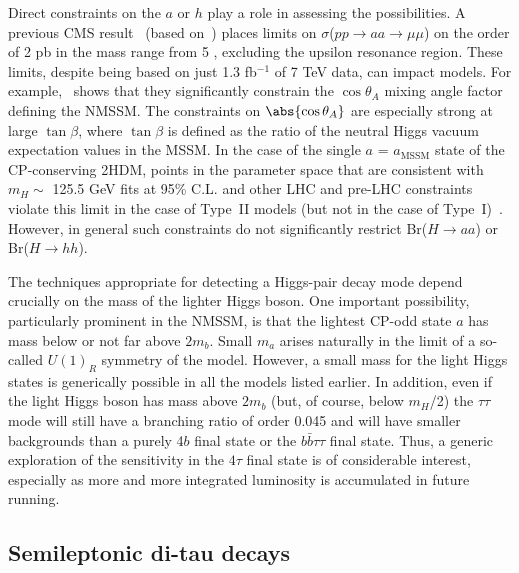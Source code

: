 Direct constraints on the $a$ or $h$ play a role in assessing the possibilities. A previous CMS result~\cite{Chatrchyan:2012am} (based on~\cite{Dermisek:2009fd}) places limits on $\sigma$($pp$$\rightarrow$$aa$$\rightarrow$$\mu\mu$) on the order of 2 pb in the mass range from 5 \GeV, excluding the upsilon resonance region.  These limits, despite being based on just 1.3 fb$^{-1}$ of 7 TeV data, can impact models. For example,~\cite{Chatrchyan:2012am} shows that they significantly constrain the $\cos\theta_A$ mixing angle factor defining the NMSSM.  The constraints on $\abs{\cos\theta_A}$ are especially strong at large $\tan\beta$, where $\tan\beta$ is defined as the ratio of the neutral Higgs vacuum expectation values in the MSSM. In the case of the single $a$ = $a_{\text{MSSM}}$ state of the CP-conserving 2HDM, points in the parameter space that are consistent with $m_H \sim$ 125.5 GeV fits at 95\% C.L. and other LHC and pre-LHC constraints violate this limit in the case of Type~II models (but not in the case of Type~I)~\cite{Dumont:2014wha}.  However, in general such constraints do not significantly restrict Br($H$$\rightarrow$$aa$) or Br($H$$\rightarrow$$hh$).  

The techniques appropriate for detecting a Higgs-pair decay mode depend crucially on the mass of the lighter Higgs boson. One important possibility, particularly prominent in the NMSSM, is that the lightest CP-odd state $a$ has mass below or not far above $2m_b$. Small $m_a$ arises naturally in the limit of a so-called $U(1)_R$ symmetry of the model. However, a small mass for the light Higgs states is generically possible in all the models listed earlier. In addition, even if the light Higgs boson has mass above $2m_b$ (but, of course, below $m_H$/2) the $\tau\tau$ mode will still have a branching ratio of order 0.045 and will have smaller backgrounds than a purely 4$b$ final state or the $b\bar{b}\tau\tau$ final state. Thus, a generic exploration of the sensitivity in the $4\tau$ final state is of considerable interest, especially as more and more integrated luminosity is accumulated in future running.

\subsection{Semileptonic di-tau decays\label{sec:semileptonic}}
